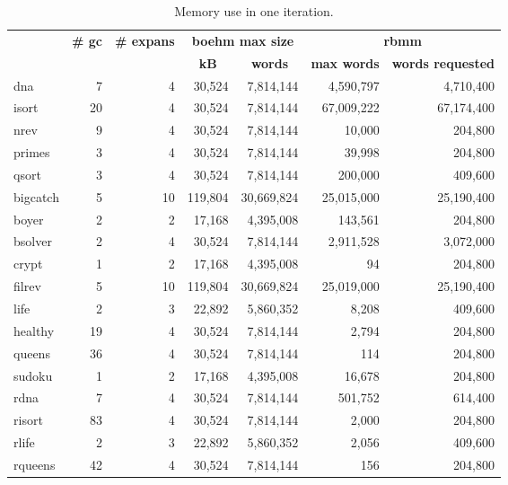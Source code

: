 \documentclass{tlp}
\begin{document}
\begin{table}
  \centering
  \scriptsize
  \caption{Memory use in one iteration.}
  \begin{tabular}{|l|*{6}{r|}}
    \hline
    \hline
    \multirow{2}{*}{} & \multicolumn{1}{c|}{\textbf{\# gc}}
    & \multicolumn{1}{c|}{\textbf{\# expans}}
    & \multicolumn{2}{c|}{\multirow{1}{*}{\textbf{boehm max size}}}
    & \multicolumn{2}{c|}{\textbf{rbmm}} \\
    & & & \multicolumn{1}{c|}{\textbf{kB}}
    & \multicolumn{1}{c|}{\textbf{words}}
    & \multicolumn{1}{c|}{\textbf{max words}}
    & \multicolumn{1}{c|}{\textbf{words requested}}\\
    \hline
    dna                &  7 &  4 &  30,524 &  7,814,144 &  4,590,797 &  4,710,400\\
    isort              & 20 &  4 &  30,524 &  7,814,144 & 67,009,222 & 67,174,400\\
    nrev               &  9 &  4 &  30,524 &  7,814,144 &     10,000 &    204,800\\
    primes             &  3 &  4 &  30,524 &  7,814,144 &     39,998 &    204,800\\
    qsort              &  3 &  4 &  30,524 &  7,814,144 &    200,000 &    409,600\\
    \hline
    bigcatch           &  5 & 10 & 119,804 & 30,669,824 & 25,015,000 & 25,190,400\\
    boyer              &  2 &  2 &  17,168 &  4,395,008 &    143,561 &    204,800\\
    bsolver            &  2 &  4 &  30,524 &  7,814,144 &  2,911,528 &  3,072,000\\
    crypt              &  1 &  2 &  17,168 &  4,395,008 &         94 &    204,800\\
    filrev             &  5 & 10 & 119,804 & 30,669,824 & 25,019,000 & 25,190,400\\
    life               &  2 &  3 &  22,892 &  5,860,352 &      8,208 &    409,600\\
    healthy            & 19 &  4 &  30,524 &  7,814,144 &      2,794 &    204,800\\
    queens             & 36 &  4 &  30,524 &  7,814,144 &        114 &    204,800\\
    sudoku             &  1 &  2 &  17,168 &  4,395,008 &     16,678 &    204,800\\
    \hline
    rdna               &  7 &  4 &  30,524 &  7,814,144 &    501,752 &    614,400\\
    risort             & 83 &  4 &  30,524 &  7,814,144 &      2,000 &    204,800\\
    rlife              &  2 &  3 &  22,892 &  5,860,352 &      2,056 &    409,600\\
    rqueens            & 42 &  4 &  30,524 &  7,814,144 &        156 &    204,800\\
    \hline
    \hline
  \end{tabular}
  \scriptsize
  \label{table:experiment:boehmdata}
  \normalsize
\end{table}
\end{document}
